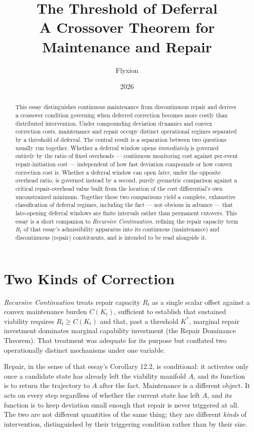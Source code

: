 \documentclass[11pt]{article}
\title{\textbf{The Threshold of Deferral}\\[4pt]
\large A Crossover Theorem for Maintenance and Repair}
\author{Flyxion}
\date{2026}
\begin{document}
\maketitle

\begin{abstract}
This essay distinguishes continuous maintenance from discontinuous repair and derives a crossover condition governing when deferred correction becomes more costly than distributed intervention. Under compounding deviation dynamics and convex correction costs, maintenance and repair occupy distinct operational regimes separated by a threshold of deferral. The central result is a separation between two questions usually run together. Whether a deferral window opens \emph{immediately} is governed entirely by the ratio of fixed overheads — continuous monitoring cost against per-event repair-initiation cost — independent of how fast deviation compounds or how convex correction cost is. Whether a deferral window can open \emph{later}, under the opposite overhead ratio, is governed instead by a second, purely geometric comparison against a critical repair-overhead value built from the location of the cost differential's own unconstrained minimum. Together these two comparisons yield a complete, exhaustive classification of deferral regimes, including the fact — not obvious in advance — that late-opening deferral windows are finite intervals rather than permanent cutovers. This essay is a short companion to \emph{Recursive Continuation}, refining the repair capacity term $R_t$ of that essay's admissibility apparatus into its continuous (maintenance) and discontinuous (repair) constituents, and is intended to be read alongside it.
\end{abstract}

\newpage
\section{Two Kinds of Correction}

\emph{Recursive Continuation} treats repair capacity $R_t$ as a single scalar offset against a convex maintenance burden $C(K_t)$, sufficient to establish that sustained viability requires $R_t \geq C(K_t)$ and that, past a threshold $K^*$, marginal repair investment dominates marginal capability investment (the Repair Dominance Theorem). That treatment was adequate for its purpose but conflated two operationally distinct mechanisms under one variable.

Repair, in the sense of that essay's Corollary 12.2, is conditional: it activates only once a candidate state has already left the viability manifold $A$, and its function is to return the trajectory to $A$ after the fact. Maintenance is a different object. It acts on every step regardless of whether the current state has left $A$, and its function is to keep deviation small enough that repair is never triggered at all. The two are not different quantities of the same thing; they are different \emph{kinds} of intervention, distinguished by their triggering condition rather than by their size.
\end{document}
